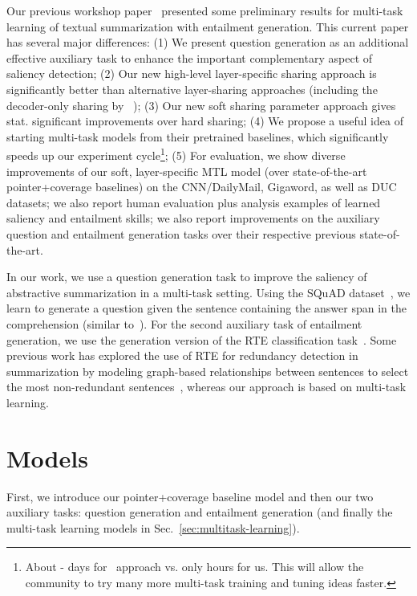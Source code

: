 \documentclass[11pt,a4paper]{article}
\begin{document}
Our previous workshop paper~\cite{Pasunuru2017TowardsIA} presented some preliminary results for multi-task learning of textual summarization with entailment generation. This current paper has several major differences: 
(1) We present question generation as an additional effective auxiliary task to enhance the important complementary aspect of saliency detection;
(2) Our new high-level layer-specific sharing approach is significantly better than alternative layer-sharing approaches (including the decoder-only sharing by ~);
(3) Our new soft sharing parameter approach gives stat. significant improvements over hard sharing;
(4) We propose a useful idea of starting multi-task models from their pretrained baselines, which significantly speeds up our experiment cycle\footnote{About - days for~ approach vs. only  hours for us. This will allow the community to try many more multi-task training and tuning ideas faster.};
(5) For evaluation, we show diverse improvements of our soft, layer-specific MTL model (over state-of-the-art pointer+coverage baselines) on the CNN/DailyMail, Gigaword, as well as DUC datasets; we also report human evaluation plus analysis examples of learned saliency and entailment skills; we also report improvements on the auxiliary question and entailment generation tasks over their respective previous state-of-the-art.




In our work, we use a question generation task to improve the saliency of abstractive summarization in a multi-task setting. Using the SQuAD dataset~\cite{rajpurkar2016squad}, we learn to generate a question given the sentence containing the answer span in the comprehension (similar to~).
For the second auxiliary task of entailment generation, we use the generation version of the RTE classification task~\cite{dagan2006pascal,lai2014illinois,jimenez2014unal,bowman2015large}. Some previous work has explored the use of RTE for redundancy detection in summarization by modeling graph-based relationships between sentences to select the most non-redundant sentences~\cite{mehdad2013abstractive,gupta2014text}, whereas our approach is based on multi-task learning.
 
\section{Models}

First, we introduce our pointer+coverage baseline model and then our two auxiliary tasks: question generation and entailment generation (and finally the multi-task learning models in Sec.~\ref{sec:multitask-learning}). 
\end{document}
